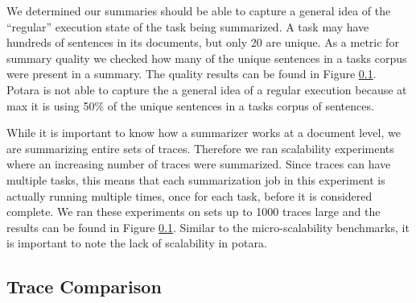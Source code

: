  We determined our summaries should be able to capture a general idea of the ``regular'' execution state of the task being summarized. 
A task may have hundreds of sentences in its documents, but only 20 are unique. As a metric for summary quality
we checked how many of the unique sentences in a tasks corpus were present in a summary. The quality results can be found in Figure \ref{}. Potara is not able to capture 
the a general idea of a regular execution because at max it is using 50\% of the unique sentences in a tasks corpus of sentences. 

 While it is important to know how a summarizer works at a document level, we are summarizing entire sets of traces. Therefore
we ran scalability experiments where an increasing number of traces were summarized. Since traces can have multiple tasks, this means that each summarization job 
in this experiment is actually running multiple times, once for each task, before it is considered complete. We ran these experiments on sets up to 1000 traces large and the 
results can be found in Figure \ref{}. Similar to the micro-scalability benchmarks, it is important to note the lack of scalability in potara. 

\subsection{Trace Comparison}